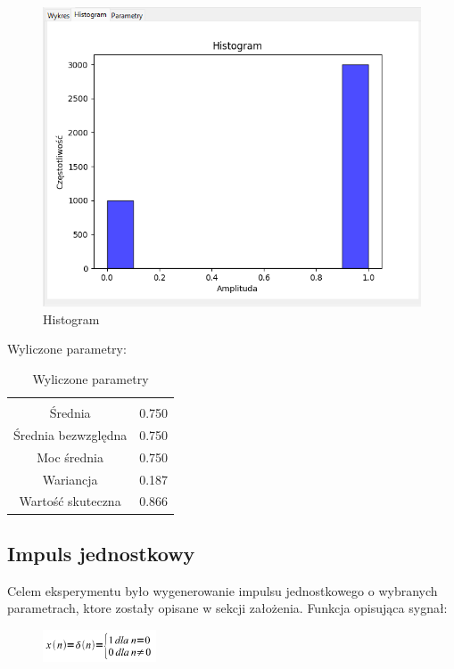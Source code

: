 \documentclass{article}
\begin{document}
\begin{figure}[h!]
    \centering
    \includegraphics[width=\textwidth]{img/skok/hist.png}
    \caption{Histogram}
\end{figure}
\FloatBarrier
Wyliczone parametry:
\begin{table}[h!]
    \centering
    \vspace{0.2cm}
    \begin{tabular}{|c|c|}
        \hline\hline\\[-0.4cm]
        Średnia & 0.750  \\
        \hline
        Średnia bezwzględna & 0.750  \\
        \hline
        Moc średnia & 0.750  \\
        \hline
        Wariancja & 0.187 \\
        \hline
        Wartość skuteczna & 0.866 \\
        \hline
    \end{tabular}
    \caption{Wyliczone parametry}
    \label{skokjednostowy}
\end{table}     

\subsection{Impuls jednostkowy} \label{impuls} 
Celem eksperymentu było wygenerowanie impulsu jednostkowego o wybranych parametrach,
ktore zostały opisane w sekcji założenia. Funkcja opisująca sygnał:

\begin{figure}[!htbp]
    \centering
    \includegraphics[width=0.3\textwidth]{img/impuls-jednostkowy.png}
\end{figure}
\end{document}
